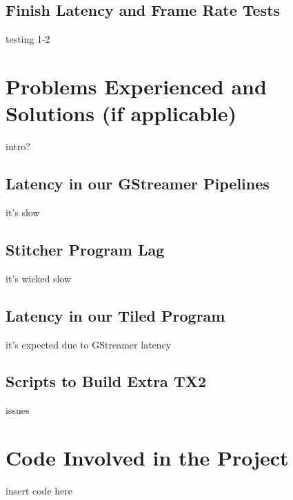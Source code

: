 \documentclass[letterpaper,10pt,serif,draftclsnofoot,onecolumn,compsoc,titlepage]{IEEEtran}
\begin{document}
\subsection{Finish Latency and Frame Rate Tests}

testing 1-2 \\

\section{Problems Experienced and Solutions (if applicable)}

intro?\\

\subsection{Latency in our GStreamer Pipelines}

it's slow \\

\subsection{Stitcher Program Lag}

it's wicked slow \\

\subsection{Latency in our Tiled Program}

it's expected due to GStreamer latency \\

\subsection{Scripts to Build Extra TX2}

issues \\

\section{Code Involved in the Project}

insert code here \\
\end{document}
